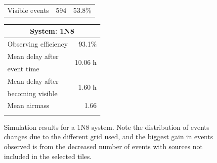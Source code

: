 \begin{colsection}
\begin{figure}[p]
\begin{center}
\begin{minipage}[t]{0.45\linewidth}
\begin{tabular}{lrr}
                \midrule
                Visible events & 594 &  53.8\% \\
            \end{tabular}
        \end{minipage}
        \begin{minipage}[t]{0.37\linewidth}\vspace{0pt}
            \begin{tabular}{lr}
                \multicolumn{2}{c}{\textbf{System: 1N8}} \\
                \midrule
                Observing efficiency & 93.1\% \\
                \midrule
                Mean delay after     & \multirow{2}{*}{10.06 h} \\
                event time           & \\
                Mean delay after     & \multirow{2}{*}{1.60 h} \\
                becoming visible     & \\
                \midrule
                Mean airmass         & 1.66 \\
                & \\
            \end{tabular}
        \end{minipage}
    \end{center}
    \caption[GW simulation results: 1N8 system]{
        Simulation results for a 1N8 system. Note the distribution of events changes due to the different grid used, and the biggest gain in events observed is from the decreased number of events with sources not included in the selected tiles.
    }\label{fig:gw_sim_1n8}
\end{figure}


\end{colsection}
